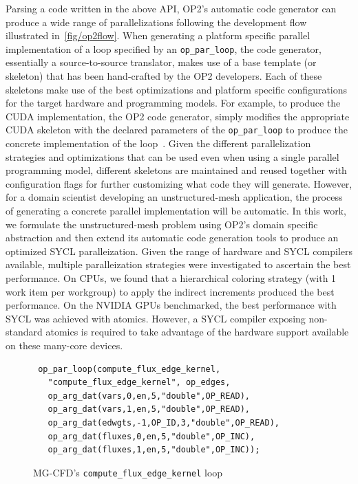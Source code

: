 \documentclass[runningheads]{llncs}
\begin{document}
Parsing a code written in the above API, OP2's automatic code generator can 
produce a wide range of parallelizations following the development flow 
illustrated in~\figurename{\ref{fig/op2flow}}. When generating a platform 
specific parallel implementation of a loop specified by an 
\texttt{op\_par\_loop}, the code generator, essentially a source-to-source 
translator, makes use of a base template (or skeleton) that has been 
hand-crafted by the OP2 developers. Each of these skeletons make use of the 
best optimizations and platform specific configurations for the target hardware 
and programming models. For example, to produce the CUDA implementation, the 
OP2 code generator, simply modifies the appropriate CUDA skeleton with the 
declared parameters of the \texttt{op\_par\_loop} to produce the concrete 
implementation of the loop~\cite{OP2-Clang-Balogh2019}. Given the different 
parallelization strategies and optimizations that can be used even when using a 
single parallel programming model, different skeletons are maintained and reused 
together with configuration flags for further customizing what code they will 
generate. However, for a domain scientist developing an unstructured-mesh 
application, the process of generating a concrete parallel implementation will 
be automatic. In this work, we formulate the unstructured-mesh problem using 
OP2's domain specific abstraction and then extend its automatic code generation
tools to produce an optimized SYCL paralleization. Given the range of hardware 
and SYCL compilers available, multiple paralleization strategies were 
investigated to ascertain the best performance. On CPUs, we found that a 
hierarchical coloring strategy (with 1 work item per workgroup) to apply the 
indirect increments produced the best performance. On the NVIDIA GPUs 
benchmarked, the best performance with SYCL was achieved with atomics. However, 
a SYCL compiler exposing non-standard atomics is required to take advantage of 
the hardware support available on these many-core devices. 

\begin{figure}[t]
\begin{verbatim}  
 op_par_loop(compute_flux_edge_kernel,
   "compute_flux_edge_kernel", op_edges,
   op_arg_dat(vars,0,en,5,"double",OP_READ),
   op_arg_dat(vars,1,en,5,"double",OP_READ),
   op_arg_dat(edwgts,-1,OP_ID,3,"double",OP_READ),
   op_arg_dat(fluxes,0,en,5,"double",OP_INC),
   op_arg_dat(fluxes,1,en,5,"double",OP_INC));
\end{verbatim}
\vspace{-20pt}\caption{MG-CFD's \texttt{compute\_flux\_edge\_kernel} loop}
\label{fig/comptfluxedge}\vspace{-15pt}
\end{figure}
\end{document}
